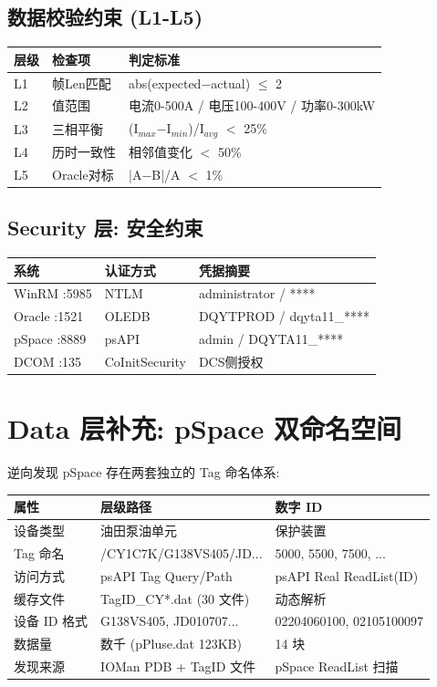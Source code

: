 \documentclass[12pt,a4paper]{ctexart}
\begin{document}
\subsection{数据校验约束 (L1-L5)}
\begin{table}[H]\centering
\begin{tabular}{lll}
\toprule
\textbf{层级} & \textbf{检查项} & \textbf{判定标准} \\
\midrule
L1 & 帧Len匹配 & abs(expected$-$actual) $\leq$ 2 \\
L2 & 值范围 & 电流0-500A / 电压100-400V / 功率0-300kW \\
L3 & 三相平衡 & (I$_{max}$$-$I$_{min}$)/I$_{avg}$ $<$ 25\% \\
L4 & 历时一致性 & 相邻值变化 $<$ 50\% \\
L5 & Oracle对标 & |A$-$B|/A $<$ 1\% \\
\bottomrule
\end{tabular}
\end{table}

\subsection{Security 层: 安全约束}
\begin{table}[H]\centering
\begin{tabular}{lll}
\toprule
\textbf{系统} & \textbf{认证方式} & \textbf{凭据摘要} \\
\midrule
WinRM :5985 & NTLM & administrator / **** \\
Oracle :1521 & OLEDB & DQYTPROD / dqyta11\_**** \\
pSpace :8889 & psAPI & admin / DQYTA11\_**** \\
DCOM :135 & CoInitSecurity & DCS侧授权 \\
\bottomrule
\end{tabular}
\end{table}

\section{Data 层补充: pSpace 双命名空间}

逆向发现 pSpace 存在两套独立的 Tag 命名体系:

\begin{table}[H]\centering
\begin{tabular}{lll}
\toprule
\textbf{属性} & \textbf{层级路径} & \textbf{数字 ID} \\
\midrule
设备类型 & 油田泵油单元 & 保护装置 \\
Tag 命名 & /CY1C7K/G138VS405/JD... & 5000, 5500, 7500, ... \\
访问方式 & psAPI Tag Query/Path & psAPI Real ReadList(ID) \\
缓存文件 & TagID\_CY*.dat (30 文件) & 动态解析 \\
设备 ID 格式 & G138VS405, JD010707... & 02204060100, 02105100097 \\
数据量 & 数千 (pPluse.dat 123KB) & 14 块 \\
发现来源 & IOMan PDB + TagID 文件 & pSpace ReadList 扫描 \\
\bottomrule
\end{tabular}
\end{table}
\end{document}
